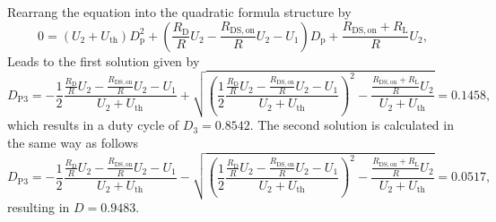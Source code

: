 \begin{solutionblock}
    Rearrang the equation into the quadratic formula structure by
    \begin{equation}
        0 = \left(U_2 + U_{\mathrm{th}} \right)D_{\mathrm{p}}^2 + \left(\frac{R_{\mathrm{D}}}{R}U_2 - \frac{R_{\mathrm{DS,on}}}{R}U_2 -U_1\right)D_{\mathrm{p}} + \frac{R_{\mathrm{DS,on}}+R_{\mathrm{L}}}{R} U_2,
    \end{equation}
    Leads to the first solution given by
    \begin{equation}
        D_{\mathrm{P3}} = -\frac{1}{2} \frac{\frac{R_{\mathrm{D}}}{R}U_2 - \frac{R_{\mathrm{DS,on}}}{R}U_2 - U_1}{U_2 + U_{\mathrm{th}}} + \sqrt{\left(\frac{1}{2} \frac{\frac{R_{\mathrm{D}}}{R}U_2 - \frac{R_{\mathrm{DS,on}}}{R}U_2 - U_1}{U_2 + U_{\mathrm{th}}}\right)^2 - \frac{\frac{R_{\mathrm{DS,on}}+R_{\mathrm{L}}}{R}U_2}{U_2+U_{\mathrm{th}}}}
        = 0.1458,
    \end{equation}
    which results in a duty cycle of $D_3 = 0.8542$.
    The second solution is calculated in the same way as follows
    \begin{equation}
        D_{\mathrm{P3}} = -\frac{1}{2} \frac{\frac{R_{\mathrm{D}}}{R}U_2 - \frac{R_{\mathrm{DS,on}}}{R}U_2 - U_1}{U_2 + U_{\mathrm{th}}} - \sqrt{\left(\frac{1}{2} \frac{\frac{R_{\mathrm{D}}}{R}U_2 - \frac{R_{\mathrm{DS,on}}}{R}U_2 - U_1}{U_2 + U_{\mathrm{th}}}\right)^2 - \frac{\frac{R_{\mathrm{DS,on}}+R_{\mathrm{L}}}{R}U_2}{U_2+U_{\mathrm{th}}}}
        = 0.0517,
    \end{equation}
    resulting in $D = 0.9483$.

\end{solutionblock}



    

